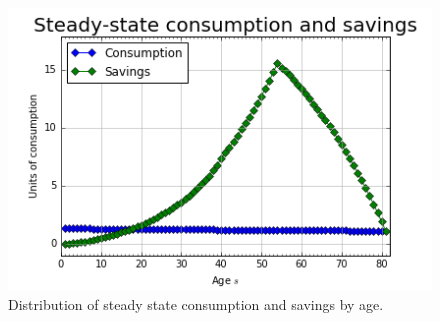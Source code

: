 \documentclass[letterpaper,12pt]{article}
\theoremstyle{definition}
\begin{document}
\begin{figure}[h!]
\centering
\includegraphics[scale=.8]{code/images/SS_bc}
\caption{Distribution of steady state consumption and savings by age.}
\end{figure}
\end{document}
